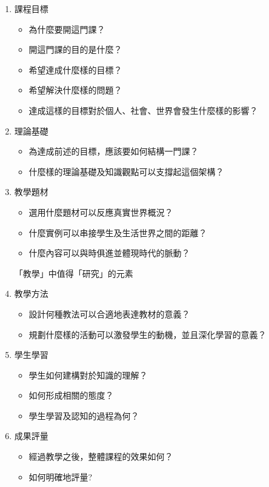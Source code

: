 \begin{enumerate}
	\item 課程目標
	\begin{itemize}
		\item 為什麼要開這門課？
		\item 開這門課的目的是什麼？
		\item 希望達成什麼樣的目標？
		\item 希望解決什麼樣的問題？
		\item 達成這樣的目標對於個人、社會、世界會發生什麼樣的影響？
	\end{itemize}
	\item 理論基礎
	\begin{itemize}
		\item 為達成前述的目標，應該要如何結構一門課？
		\item 什麼樣的理論基礎及知識觀點可以支撐起這個架構？
	\end{itemize}
	\item 教學題材
	\begin{itemize}
		\item 選用什麼題材可以反應真實世界概況？
		\item 什麼實例可以串接學生及生活世界之間的距離？
		\item 什麼內容可以與時俱進並體現時代的脈動？
	\end{itemize}
「教學」中值得「研究」的元素
	\item 教學方法
	\begin{itemize}
		\item 設計何種教法可以合適地表達教材的意義？
		\item 規劃什麼樣的活動可以激發學生的動機，並且深化學習的意義？
	\end{itemize}
	\item 學生學習
	\begin{itemize}
		\item 學生如何建構對於知識的理解？
		\item 如何形成相關的態度？
		\item 學生學習及認知的過程為何？
	\end{itemize}
	\item 成果評量
	\begin{itemize}
		\item 經過教學之後，整體課程的效果如何？
		\item 如何明確地評量?
	\end{itemize}
\end{enumerate}
\par

